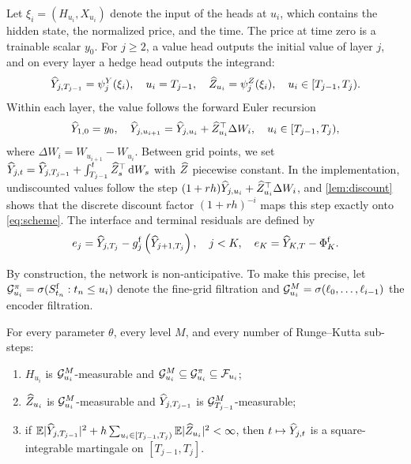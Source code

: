 Let $\xi_i=(H_{u_i},X_{u_i})$ denote the input of the heads at $u_i$, which contains the hidden state, the normalized price, and the time. The price at time zero is a trainable scalar $y_0$. For $j\ge2$, a value head outputs the initial value of layer $j$, and on every layer a hedge head outputs the integrand:
\[
\widehat Y_{j,T_{j-1}}=\psi^Y_{j}(\xi_{i}),\quad u_i=T_{j-1},\quad
\widehat Z_{u_i}=\psi^Z_{j}(\xi_i),\quad u_i\in[T_{j-1},T_j).
\]
Within each layer, the value follows the forward Euler recursion
\begin{equation}\label{eq:scheme}
\widehat Y_{1,0}=y_0,\quad \widehat Y_{j,u_{i+1}}=\widehat Y_{j,u_i}+\widehat Z_{u_i}^\top\Delta W_i,\quad u_i\in[T_{j-1},T_j),
\end{equation}
where $\Delta W_i=W_{u_{i+1}}-W_{u_i}$. Between grid points, we set $\widehat Y_{j,t}=\widehat Y_{j,T_{j-1}}+\int_{T_{j-1}}^t\widehat Z_s^\top\,\mathrm{d} W_s$ with $\widehat Z$ piecewise constant. In the implementation, undiscounted values follow the step $(1+rh)\widehat Y_{j,u_i}+\widehat Z_{u_i}^\top\Delta W_i$, and \cref{lem:discount} shows that the discrete discount factor $(1+rh)^{-i}$ maps this step exactly onto \eqref{eq:scheme}. The interface and terminal residuals are defined by
\begin{equation}\label{eq:residual}
e_j=\widehat Y_{j,T_j}-g^{\mathrm f}_j\left(\widehat Y_{j+1,T_j}\right),\quad j<K,\quad e_K=\widehat Y_{K,T}-\Phi^{\mathrm f}_K .
\end{equation}

By construction, the network is non-anticipative. To make this precise, let $\mathcal{G}^{\pi}_{u_i}=\sigma(S^{\mathrm f}_{t_n}:t_n\le u_i)$ denote the fine-grid filtration and $\mathcal{G}^{M}_{u_i}=\sigma(\ell_0,\dots,\ell_{i-1})$ the encoder filtration.

\begin{lemma}\label{lem:nonanticipation}
For every parameter $\theta$, every level $M$, and every number of Runge--Kutta sub-steps:
\begin{enumerate}[label=(\roman*)]
\item $H_{u_i}$ is $\mathcal{G}^{M}_{u_i}$-measurable and $\mathcal{G}^{M}_{u_i}\subseteq\mathcal{G}^{\pi}_{u_i}\subseteq\mathcal{F}_{u_i}$;
\item $\widehat Z_{u_i}$ is $\mathcal{G}^{M}_{u_i}$-measurable and $\widehat Y_{j,T_{j-1}}$ is $\mathcal{G}^{M}_{T_{j-1}}$-measurable;
\item if $\mathbb{E}\lvert \widehat Y_{j,T_{j-1}}\rvert^2+h\sum_{u_i\in[T_{j-1},T_j)}\mathbb{E}\lvert \widehat Z_{u_i}\rvert^2<\infty$, then $t\mapsto\widehat Y_{j,t}$ is a square-integrable martingale on $[T_{j-1},T_j]$.
\end{enumerate}
\end{lemma}

